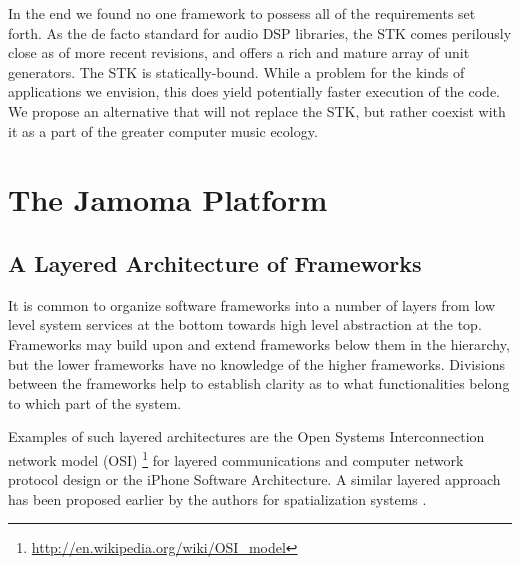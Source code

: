 \documentclass[twoside,10pt]{article}
\begin{document}
In the end we found no one framework to possess all of the requirements set forth.  As the de facto standard for audio DSP libraries, the STK comes perilously close as of more recent revisions\cite{Scavone:2005}, and offers a rich and mature array of unit generators.  The STK is statically-bound.  While a problem for the kinds of applications we envision, this does yield potentially faster execution of the code.  We propose an alternative that will not replace the STK, but rather coexist with it as a part of the greater computer music ecology.


%






\section{The Jamoma Platform} %

\subsection{A Layered Architecture of Frameworks}


It is common to organize software frameworks into a number of layers from low level system services at the bottom towards high level abstraction at the top. Frameworks may build upon and extend frameworks below them in the hierarchy, but the lower frameworks have no knowledge of the higher frameworks.  Divisions between the frameworks help to establish clarity as to what functionalities belong to which part of the system. 

Examples of such layered architectures are the Open Systems Interconnection network model (OSI) \footnote{\url{http://en.wikipedia.org/wiki/OSI_model}} for layered communications and computer network protocol design or the iPhone Software Architecture. A similar layered approach has been proposed earlier by the authors for spatialization systems \cite{Peters:2009}. 
\end{document}
